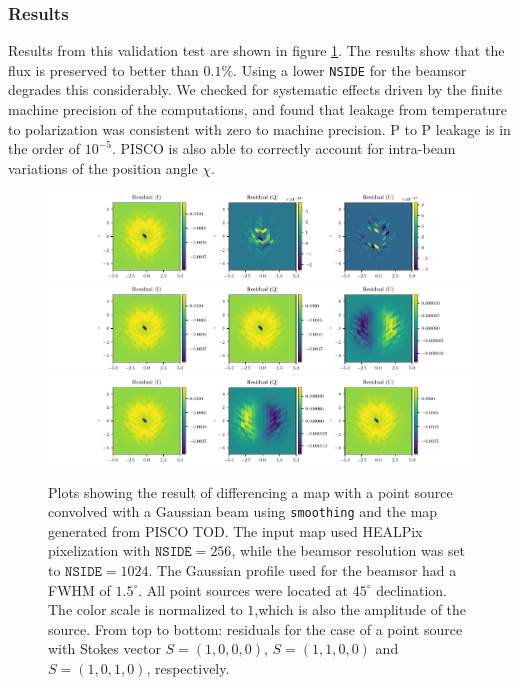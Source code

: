 \documentclass[a4paper,11pt]{article}
\begin{document}
\subsubsection{Results}

Results from this validation test are shown in figure \ref{fig::stokesqsource256beam1024dec45}. The results show that the flux is preserved to better than $0.1\%$. Using a lower \texttt{NSIDE} for the beamsor degrades this considerably. We checked for systematic effects driven by the finite machine precision of the computations, and found that leakage from temperature to polarization was consistent with zero to machine precision. P to P leakage is in the order of $10^{-5}$. PISCO is also able to correctly account for intra-beam variations of the position angle $\chi$.

\begin{figure}
	\centering
	\includegraphics[width=1.0\linewidth]{figures/figure5_3rd_I.pdf}
	\includegraphics[width=1.0\linewidth]{figures/figure5_3rd_Q.pdf}
	\includegraphics[width=1.0\linewidth]{figures/figure5_3rd_U.pdf}
	\caption{Plots showing the result of differencing a map with a point source convolved with a Gaussian beam using \texttt{smoothing} and the map generated from PISCO TOD. The input map used HEALPix pixelization with $\mathrm{\texttt{NSIDE}} = 256$, while the beamsor resolution was set to $\mathrm{\texttt{NSIDE}} = 1024$. The Gaussian profile used for the beamsor had a FWHM of $1.5^\circ$. All point sources were located at $45^\circ$ declination. The color scale is normalized to $1$,which is also the amplitude of the source. From top to bottom: residuals for the case of a point source with Stokes vector $S = (1,0,0,0)$, $S=(1,1,0,0)$ and $S=(1,0,1,0)$, respectively.}
	\label{fig::stokesqsource256beam1024dec45}
\end{figure}
\end{document}
